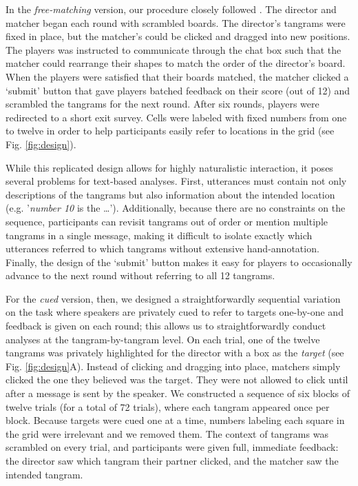 \documentclass[alpha-refs]{wiley-article}
\begin{document}
In the \emph{free-matching} version, our procedure closely followed \cite{clarkReferringCollaborativeProcess1986}. 
The director and matcher began each round with scrambled boards. 
The director's tangrams were fixed in place, but the matcher's could be clicked and dragged into new positions.
The players was instructed to communicate through the chat box such that the matcher could  rearrange their shapes to match the order of the director's board.
When the players were satisfied that their boards matched, the matcher clicked a `submit' button that gave players batched feedback on their score (out of 12) and scrambled the tangrams for the next round. 
After six rounds, players were redirected to a short exit survey. 
Cells were labeled with fixed numbers from one to twelve in order to help participants easily refer to locations in the grid (see Fig. \ref{fig:design}).

While this replicated design allows for highly naturalistic interaction, it poses several problems for text-based analyses. First, utterances must contain not only descriptions of the tangrams but also information about the intended location (e.g. '\emph{number 10} is the \dots'). Additionally, because there are no constraints on the sequence, participants can revisit tangrams out of order or mention multiple tangrams in a single message, making it difficult to isolate exactly which utterances referred to which tangrams without extensive hand-annotation. Finally, the design of the `submit' button makes it easy for players to occasionally advance to the next round without referring to all 12 tangrams. 

For the \emph{cued} version, then, we designed a straightforwardly sequential variation on the task where speakers are privately cued to refer to targets one-by-one and feedback is given on each round; this allows us to straightforwardly conduct analyses at the tangram-by-tangram level. On each trial, one of the twelve tangrams was privately highlighted for the director with a box as the \emph{target} (see Fig. \ref{fig:design}A). Instead of clicking and dragging into place, matchers simply clicked the one they believed was the target. They were not allowed to click until after a message is sent by the speaker.  We constructed a sequence of six blocks of twelve trials (for a total of 72 trials), where each tangram appeared once per block.%
Because targets were cued one at a time, numbers labeling each square in the grid were irrelevant and we removed them. The context of tangrams was scrambled on every trial, and participants were given full, immediate feedback: the director saw which tangram their partner clicked, and the matcher saw the intended tangram.
\end{document}
